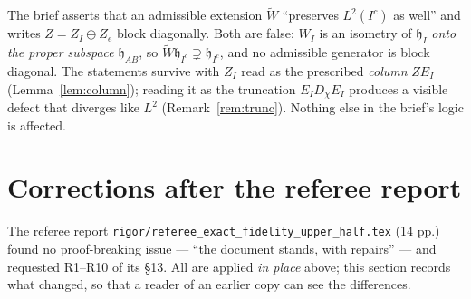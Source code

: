 \documentclass[11pt]{article}
\newcommand{\Wt}{\widetilde W}\newcommand{\kt}{\widetilde k}\newcommand{\Om}{\Omega}\newcommand{\Gm}{\Gamma}
\begin{document}
\begin{verdictbreak}
The brief asserts that an admissible extension $\Wt$ ``preserves $L^2(I^c)$ as well'' and writes
$Z=Z_I\oplus Z_e$ block diagonally.  Both are false: $W_I$ is an isometry of $\mathfrak h_I$
\emph{onto the proper subspace} $\mathfrak h_{AB}$, so $\Wt\mathfrak h_{I^c}\supsetneq
\mathfrak h_{I^c}$, and no admissible generator is block diagonal.  The statements survive with
$Z_I$ read as the prescribed \emph{column} $ZE_I$ (Lemma~\ref{lem:column}); reading it as the
truncation $E_ID_\chi E_I$ produces a visible defect that diverges like $L^2$
(Remark~\ref{rem:trunc}).  Nothing else in the brief's logic is affected.
\end{verdictbreak}

\section{Corrections after the referee report}\label{sec:corr}

The referee report \texttt{rigor/referee\_exact\_fidelity\_upper\_half.tex} (14 pp.) found no
proof-breaking issue --- ``the document stands, with repairs'' --- and requested R1--R10 of its
\S13.  All are applied \emph{in place} above; this section records what changed, so that a reader
of an earlier copy can see the differences.
\end{document}
